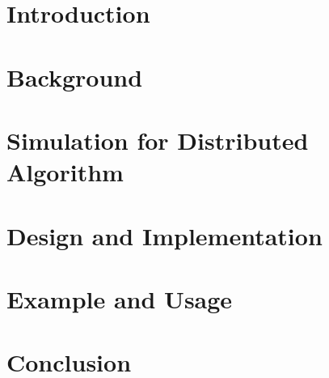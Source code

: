 \documentclass[pdftex,12pt]{report}
\begin{document}
%

\tableofcontents
\listoffigures
{}
\listoftables
{}


\chapter{Introduction}



\chapter{Background}



\chapter{Simulation for Distributed Algorithm}



\chapter{Design and Implementation}



\chapter{Example and Usage}


\chapter{Conclusion}





\end{document}
